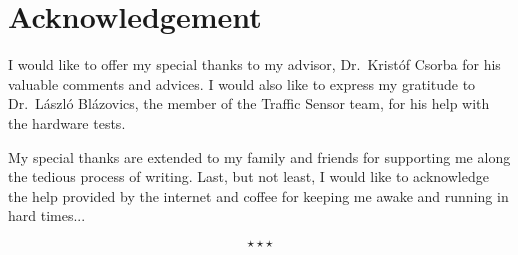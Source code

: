 \chapter*{Acknowledgement}

I would like to offer my special thanks to my advisor, Dr.~Krist{\'o}f Csorba for his valuable comments and advices.
I would also like to express my gratitude to Dr.~L{\'a}szl{\'o} Bl{\'a}zovics, the member of the Traffic Sensor team, for his help with the hardware tests.

My special thanks are extended to my family and friends for supporting me along the tedious process of writing.
Last, but not least, I would like to acknowledge the help provided by the internet and coffee for keeping me awake and running in hard times...


\begin{displaymath}
	\star \star \star
\end{displaymath}